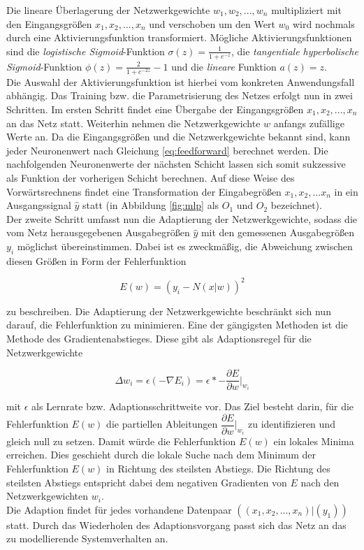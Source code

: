 Die lineare Überlagerung der Netzwerkgewichte $w_1,w_2,...,w_n$ multipliziert mit den Eingangsgrößen $x_1,x_2,...,x_n$ und verschoben um den Wert $w_0$ wird nochmals durch eine Aktivierungsfunktion transformiert. Mögliche Aktivierungsfunktionen sind die \textit{logistische Sigmoid}-Funktion $\sigma(z) = \frac{1}{1 + e^{-z}}$, die \textit{tangentiale hyperbolische Sigmoid}-Funktion $\phi(z)=\frac{2}{1 + e^{-2z}}-1$ und die \textit{lineare} Funktion $a(z)=z$. \\ 
Die Auswahl der Aktivierungsfunktion ist hierbei vom konkreten Anwendungsfall abhängig. Das Training bzw. die Parametrisierung des Netzes erfolgt nun in zwei Schritten. Im ersten Schritt findet eine Übergabe der Eingangsgrößen $x_1,x_2,...,x_n$ an das Netz statt. Weiterhin nehmen die Netzwerkgewichte $w$ anfangs zufällige Werte an. Da die Eingangsgrößen und die Netzwerkgewichte bekannt sind, kann jeder Neuronenwert nach Gleichung \ref{eq:feedforward} berechnet werden. Die nachfolgenden Neuronenwerte der nächsten Schicht lassen sich somit sukzessive als Funktion der vorherigen Schicht berechnen. Auf diese Weise des Vorwärtsrechnens findet eine Transformation der Eingabegrößen $x_1,x_2,...x_n$ in ein Ausgangssignal $\hat{y}$ statt (in Abbildung \ref{fig:mlp} als $O_1$ und $O_2$ bezeichnet). \\
Der zweite Schritt umfasst nun die Adaptierung der Netzwerkgewichte, sodass die vom Netz herausgegebenen Ausgabegrößen $\hat{y}$ mit den gemessenen Ausgabegrößen $y_i$ möglichst übereinstimmen. Dabei ist es zweckmäßig, die Abweichung zwischen diesen Größen in Form der Fehlerfunktion 

\begin{equation}
E(w) = (y_i-N(x|w))^{2}
\end{equation}

zu beschreiben. Die Adaptierung der Netzwerkgewichte beschränkt sich nun darauf, die Fehlerfunktion zu minimieren. Eine der gängigsten Methoden ist die Methode des Gradientenabstieges. Diese gibt als Adaptionsregel für die Netzwerkgewichte 

\begin{equation}
\label{eq:weight_adapt}
\Delta w_i = \epsilon  (-\nabla E_i) = \epsilon * - \dfrac{\partial E}{\partial w}\bigg|_{w_i}
\end{equation}

mit $\epsilon$ als Lernrate bzw. Adaptionsschrittweite vor. Das Ziel besteht darin, für die Fehlerfunktion $E(w)$ die partiellen Ableitungen $\dfrac{\partial E}{\partial w}\bigg|_{w_i}$ zu identifizieren und gleich null zu setzen. Damit würde die Fehlerfunktion $E(w)$ ein lokales Minima erreichen. Dies geschieht durch die lokale Suche nach dem Minimum der Fehlerfunktion $E(w)$ in Richtung des steilsten Abstiegs. Die Richtung des steilsten Abstiegs entspricht dabei dem negativen Gradienten von $E$ nach den Netzwerkgewichten $w_i$.\\ 
Die Adaption findet für jedes vorhandene Datenpaar $((x_1,x_2,...,x_n)|(y_1))$ statt. Durch das Wiederholen des Adaptionsvorgang passt sich das Netz an das zu modellierende Systemverhalten an. \\

